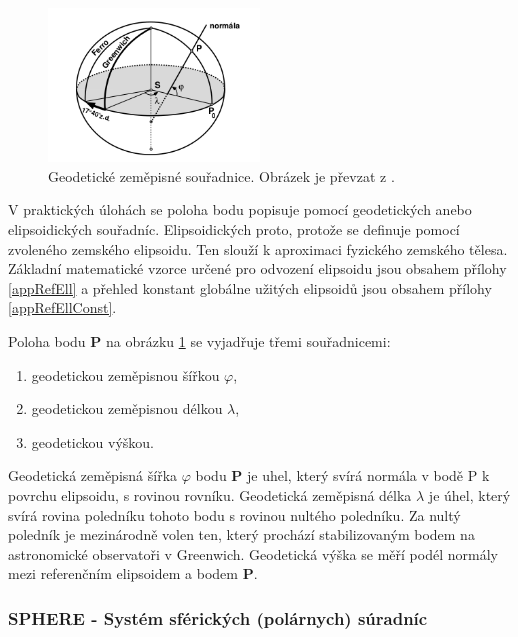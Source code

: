 \documentclass[11pt,a4paper]{article}
\begin{document}
\begin{figure}[ht!]
\begin{center}
\includegraphics[width=0.50\textwidth]{FIG/geod_cimb}
\caption{Geodetické zeměpisné souřadnice. Obrázek je převzat z \cite{Cimbalnik1997}.}
\label{fig:geod}
\end{center}
\end{figure}

V praktických úlohách se poloha bodu popisuje pomocí geodetických anebo elipsoidických souřadníc. Elipsoidických proto, protože se definuje pomocí zvoleného zemského elipsoidu. Ten slouží k aproximaci fyzického zemského tělesa. Základní matematické vzorce určené pro odvození elipsoidu jsou obsahem přílohy \ref{appRefEll} a přehled konstant globálne užitých elipsoidů jsou obsahem přílohy \ref{appRefEllConst}.

Poloha bodu \textbf{P} na obrázku \ref{fig:geod} se vyjadřuje třemi souřadnicemi:

\begin{enumerate}
\item geodetickou zeměpisnou šířkou $\varphi$,
\item geodetickou zeměpisnou délkou $\lambda$,
\item geodetickou výškou.
\end{enumerate} 

Geodetická zeměpisná šířka $\varphi$ bodu \textbf{P} je uhel, který svírá normála v bodě P k povrchu elipsoidu, s rovinou rovníku. Geodetická zeměpisná délka $\lambda$ je úhel, který svírá rovina poledníku tohoto bodu s rovinou nultého poledníku. Za nultý poledník je mezinárodně volen ten, který prochází stabilizovaným bodem na astronomické observatoři v Greenwich. Geodetická výška se měří podél normály mezi referenčním elipsoidem a bodem \textbf{P}.

\subsubsection{SPHERE - Systém sférických (polárnych) súradníc}
\end{document}
